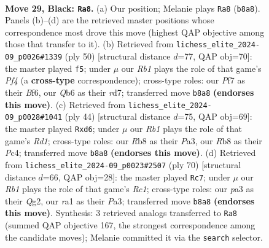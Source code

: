 \documentclass[11pt]{article}
\begin{document}
\clearpage

\begin{figure}[p]\centering
\begin{subfigure}{0.46\textwidth}\centering
\resizebox{\linewidth}{!}{%
\newchessgame
\chessboard[
  setfen={1r1r4/pp3pk1/1q6/7p/bP2PQ2/P5Pp/5P2/RB2R1K1 b - - 0 29},
  showmover=false,
  pgfstyle=straightmove, color=movearrow, markmove={b8-a8}
]}
\caption{}
\end{subfigure}\hfill
\begin{subfigure}{0.46\textwidth}\centering
\resizebox{\linewidth}{!}{%
\newchessgame
\chessboard[
  setfen={4r1k1/p2r1p1p/1p1P1Bp1/b1pQ4/2P2Pq1/8/P6P/3R1R1K w - - 4 26},
  showmover=false,
  pgfstyle=straightmove, color=movearrow, markmove={f4-f5}
]}
\caption{}
\end{subfigure}
\\[4pt]
\begin{subfigure}{0.46\textwidth}\centering
\resizebox{\linewidth}{!}{%
\newchessgame
\chessboard[
  setfen={r5k1/5pp1/2prp2p/p1q5/2P1Q3/P5P1/1P3PP1/3RR1K1 w - - 0 23},
  showmover=false,
  pgfstyle=straightmove, color=movearrow, markmove={d1-d6}
]}
\caption{}
\end{subfigure}\hfill
\begin{subfigure}{0.46\textwidth}\centering
\resizebox{\linewidth}{!}{%
\newchessgame
\chessboard[
  setfen={r5k1/5p2/p5p1/3rp2p/1B3q2/P3bP2/6QP/2R2R1K w - - 0 36},
  showmover=false,
  pgfstyle=straightmove, color=movearrow, markmove={c1-c7}
]}
\caption{}
\end{subfigure}
\caption{\textbf{Move 29, Black: \texttt{Ra8}.} (a) Our position; Melanie plays \texttt{Ra8} (\texttt{b8a8}). Panels (b)--(d) are the retrieved master positions whose correspondence most drove this move (highest QAP objective among those that transfer to it). (b) Retrieved from \texttt{lichess\_elite\_2024-09\_p0026\#1339} (ply 50) [structural distance $d$=77, QAP obj=70]: the master played \texttt{f5}; under $\mu$ our \emph{Rb1} plays the role of that game's \emph{Pf4} (a \textbf{cross-type} correspondence); cross-type roles: our \emph{P}f7 as their \emph{B}f6, our \emph{Q}b6 as their \emph{r}d7; transferred move \texttt{b8a8} \textbf{(endorses this move)}. (c) Retrieved from \texttt{lichess\_elite\_2024-09\_p0028\#1041} (ply 44) [structural distance $d$=75, QAP obj=69]: the master played \texttt{Rxd6}; under $\mu$ our \emph{Rb1} plays the role of that game's \emph{Rd1}; cross-type roles: our \emph{R}b8 as their \emph{P}a3, our \emph{R}b8 as their \emph{P}c4; transferred move \texttt{b8a8} \textbf{(endorses this move)}. (d) Retrieved from \texttt{lichess\_elite\_2024-09\_p0023\#2507} (ply 70) [structural distance $d$=66, QAP obj=28]: the master played \texttt{Rc7}; under $\mu$ our \emph{Rb1} plays the role of that game's \emph{Rc1}; cross-type roles: our \emph{p}a3 as their \emph{Q}g2, our \emph{r}a1 as their \emph{P}a3; transferred move \texttt{b8a8} \textbf{(endorses this move)}. Synthesis: 3 retrieved analogs transferred to \texttt{Ra8} (summed QAP objective 167, the strongest correspondence among the candidate moves); Melanie committed it via the \texttt{search} selector.}
\label{fig:thought-m57}
\end{figure}
\end{document}
